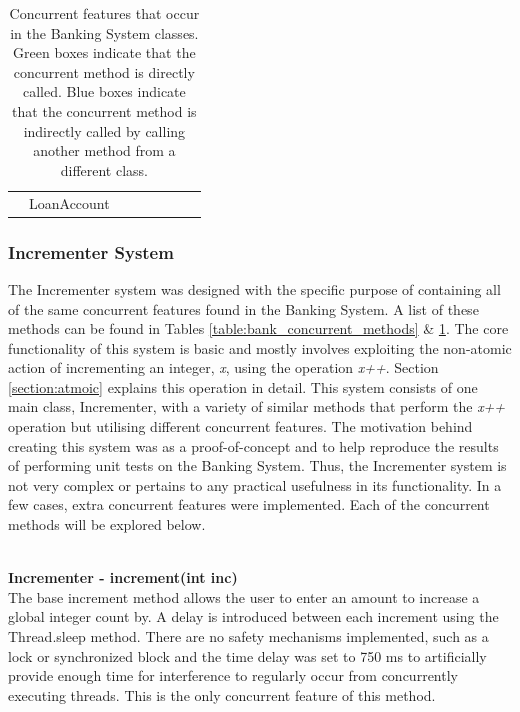 \documentclass[a4paper,12pt]{article}
\begin{document}
\begin{table}[]
\begin{tabular}{lcllllll}
\multicolumn{1}{l|}{}                                                                                         & \multicolumn{1}{c|}{LoanAccount}    & \multicolumn{1}{l|}{\cellcolor[HTML]{32CB00}} & \multicolumn{1}{l|}{\cellcolor[HTML]{32CB00}} & \multicolumn{1}{l|}{\cellcolor[HTML]{31A4FF}} & \multicolumn{1}{l|}{\cellcolor[HTML]{31A4FF}} & \multicolumn{1}{l|}{\cellcolor[HTML]{31A4FF}} & \multicolumn{1}{l|}{\cellcolor[HTML]{31A4FF}} \\ \cline{2-8} 
\end{tabular}
\caption{Concurrent features that occur in the Banking System classes. Green boxes indicate that the concurrent method is directly called. Blue boxes indicate that the concurrent method is indirectly called by calling another method from a different class.}
\label{table:bank_concurrent_classes}
\end{table}


\subsubsection{Incrementer System}
The Incrementer system was designed with the specific purpose of containing all of the same concurrent features found in the Banking System. A list of these methods can be found in Tables \ref{table:bank_concurrent_methods} \& \ref{table:bank_concurrent_classes}. The core functionality of this system is basic and mostly involves exploiting the non-atomic action of incrementing an integer, \textit{x}, using the operation \textit{x++}. Section \ref{section:atmoic} explains this operation in detail. This system consists of one main class, Incrementer, with a variety of similar methods that perform the \textit{x++} operation but utilising different concurrent features. The motivation behind creating this system was as a proof-of-concept and to help reproduce the results of performing unit tests on the Banking System. Thus, the Incrementer system is not very complex or pertains to any practical usefulness in its functionality. In a few cases, extra concurrent features were implemented. Each of the concurrent methods will be explored below.        
	    
\textbf{\\Incrementer - increment(int inc)}	    
\\The base increment method allows the user to enter an amount to increase a global integer count by. A delay is introduced between each increment using the Thread.sleep method. There are no safety mechanisms implemented, such as a lock or synchronized block and  the time delay was set to 750 ms to artificially provide enough time for interference to regularly occur from concurrently executing threads. This is the only concurrent feature of this method.  
\end{document}
